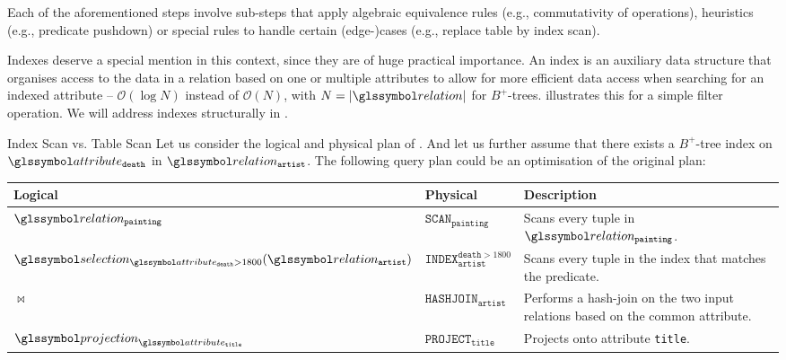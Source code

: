 Each of the aforementioned steps involve sub-steps that apply algebraic equivalence rules \cite{Garcia:2009Database}  (e.g., commutativity of operations), heuristics \cite{Garcia:2009Database,Graefe:1993Query,Swami:1989Optimization,Bruno:2010Polynomial,Tsialiamanis:2012Heuristics,} (e.g., predicate pushdown) or special rules to handle certain (edge-)cases \cite{Jarke:1984Query,Graefe:1993Query} (e.g., replace table by index scan). 

Indexes deserve a special mention in this context, since they are of huge practical importance. An index is an auxiliary data structure that organises access to the data in a relation based on one or multiple attributes to allow for more efficient data access when searching for an indexed attribute -- $\mathcal{O}(\log N)$ instead of $\mathcal{O}(N)$, with $N = |\relation|$ for $B^{+}$-trees.  illustrates this for a simple filter operation. We will address indexes structurally in .

\begin{example}[label=example:index_scan]{Index Scan vs. Table Scan}{}
    Let us consider the logical and physical plan of . And let us further assume that there exists a  $B^{+}$-tree index on $\attribute_{\mathtt{death}}$ in $\relation_{\mathtt{artist}}$. The following query plan could be an optimisation of the original plan:

    \begin{center}
        \begin{tabular}{| l | l | p{6cm} |}
            \hline
            \textbf{Logical} & \textbf{Physical} & \textbf{Description} \\ 
            \hline
            \hline
            $\relation_{\mathtt{painting}}$ & $\mathtt{SCAN}_{\mathtt{painting}}$ & Scans every tuple in $\relation_{\mathtt{painting}}$. \\
            \hline
            $\selection_{\attribute_{\mathtt{death}} > 1800}(\relation_{\mathtt{artist}})$ & $\mathtt{INDEX}^{\mathtt{death} > 1800}_{\mathtt{artist}}$ & Scans every tuple in the index that matches the predicate. \\
            \hline
            $\Join$ & $\mathtt{HASHJOIN}_{\mathtt{artist}}$ & Performs a hash-join on the two input relations based on the common attribute. \\
            \hline
            $\projection_{\attribute_{\mathtt{title}}}$ & $\mathtt{PROJECT}_{\mathtt{title}}$ & Projects onto attribute \texttt{title}. \\
            \hline
        \end{tabular}
    \end{center}
\end{example}



